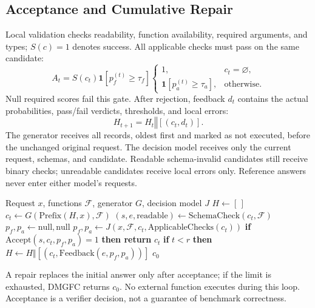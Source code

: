 \subsection{Acceptance and Cumulative Repair}
Local validation checks readability, function availability, required arguments, and types; $S(c)=1$ denotes success. All applicable checks must pass on the same candidate:
\begin{equation}
A_t=S(c_t)\mathbf{1}[p_f^{(t)}\geq\tau_f]
\begin{cases}
1,&c_t=\varnothing,\\
\mathbf{1}[p_a^{(t)}\geq\tau_a],&\text{otherwise}.
\end{cases}
\label{eq:gate}
\end{equation}
Null required scores fail this gate. After rejection, feedback $d_t$ contains the actual probabilities, pass/fail verdicts, thresholds, and local errors:
\begin{equation}
H_{t+1}=H_t\mathbin{\Vert}[(c_t,d_t)].
\end{equation}
The generator receives all records, oldest first and marked as not executed, before the unchanged original request. The decision model receives only the current request, schemas, and candidate. Readable schema-invalid candidates still receive binary checks; unreadable candidates receive local errors only. Reference answers never enter either model's requests.

\begin{algorithm}[t]
\caption{\textbf{DMGFC}: verification and cumulative repair}
\label{alg:jbfc}
\footnotesize
\begin{algorithmic}[1]
\Require Request $x$, functions $\mathcal{F}$, generator $G$, decision model $J$
\State $H\gets[\,]$
  \State $c_t\gets G(\mathrm{Prefix}(H,x),\mathcal{F})$
  \State $(s,e,\mathrm{readable})\gets\mathrm{SchemaCheck}(c_t,\mathcal{F})$
  \State $p_f,p_a\gets\mathrm{null},\mathrm{null}$
    \State $p_f,p_a\gets J(x,\mathcal{F},c_t,\mathrm{ApplicableChecks}(c_t))$
  \EndIf
  \State \textbf{if} $\mathrm{Accept}(s,c_t,p_f,p_a)=1$ \textbf{then return} $c_t$
  \State \textbf{if} $t<r$ \textbf{then} $H\gets H\Vert[(c_t,\mathrm{Feedback}(e,p_f,p_a))]$
\EndFor
\State \Return $c_0$
\end{algorithmic}
\end{algorithm}
A repair replaces the initial answer only after acceptance; if the limit is exhausted, DMGFC returns $c_0$. No external function executes during this loop. Acceptance is a verifier decision, not a guarantee of benchmark correctness.
